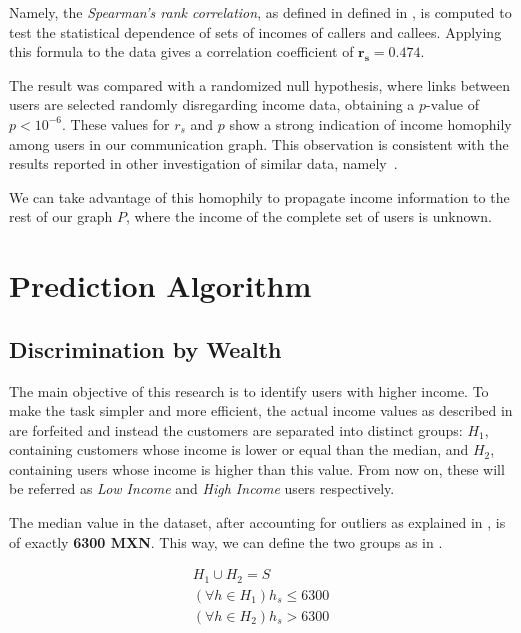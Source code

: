 Namely, the \textit{Spearman's rank correlation}, as defined in defined in , is computed to test the statistical dependence of sets of incomes of callers and callees. Applying this formula to the data gives a correlation coefficient of $\mathbf{r_s = 0.474}$.

The result was compared with a randomized null hypothesis, where links between users are selected randomly disregarding income data, obtaining a $p\text{-value}$ of $p < 10^{-6}$. These values for $r_s$ and $p$ show a strong indication of income homophily among users in our communication graph. This observation is consistent with the results reported in other investigation of similar data, namely~\cite{leo2015socioeconomic}.

We can take advantage of this homophily to propagate income information to the rest of our graph $P$, where the income of the complete set of users is unknown.

\section{Prediction Algorithm}
\label{subsec:prediction_algorithm}

\subsection{Discrimination by Wealth}
\label{subsec:discrimination_by_wealth}

The main objective of this research is to identify users with higher income. To make the task simpler and more efficient, the actual income values as described in  are forfeited and instead the customers are separated into distinct groups: $H_1$, containing customers whose income is lower or equal than the median, and $H_2$, containing users whose income is higher than this value. From now on, these will be referred as \emph{Low Income} and \emph{High Income} users respectively.

The median value in the dataset, after accounting for outliers as explained in , is of exactly \textbf{6300 MXN}. This way, we can define the two groups as in .

\begin{equation}
\label{eq:h}
\begin{gathered}
H_1 \cup H_2 = S \\
\left( \forall h \in H_1 \right) h_s \leq 6300 \\
\left( \forall h \in H_2 \right) h_s > 6300
\end{gathered}
\end{equation}

